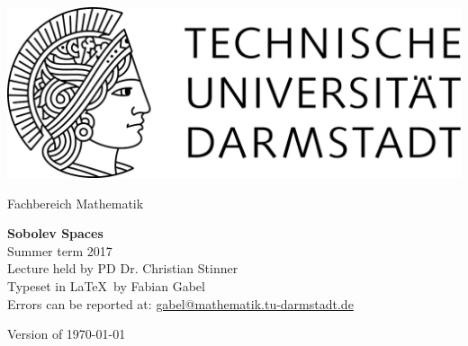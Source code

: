 \documentclass[11pt,a4paper,leqno]{report}
\begin{document}
\hypersetup{pageanchor=false}
\begin{titlepage}
  \begin{center}
    \vspace{1cm}
    \includegraphics[width=0.5\linewidth]{TU_Darmstadt_Logo.pdf}
    \vspace{1cm}
    
    \large{Fachbereich Mathematik}
    \vspace{3.5cm}
    
    \Huge{\textbf{Sobolev Spaces}\\}
    \vspace*{0.5cm}    
    \Large{{Summer term 2017}\\}
    \vspace*{0.5cm}    
    \small{Lecture held by PD Dr. Christian Stinner\\}
    \vspace*{1.0cm}
    \small{Typeset in \LaTeX\ by Fabian Gabel\\}
    \small{Errors can be reported at: \url{gabel@mathematik.tu-darmstadt.de}}

    \vspace*{\fill}
    \small{Version of \today}
  \end{center}
\end{titlepage}

\hypersetup{pageanchor=true}
\tableofcontents




%
%
%
%

\nocite{*}


\end{document}
